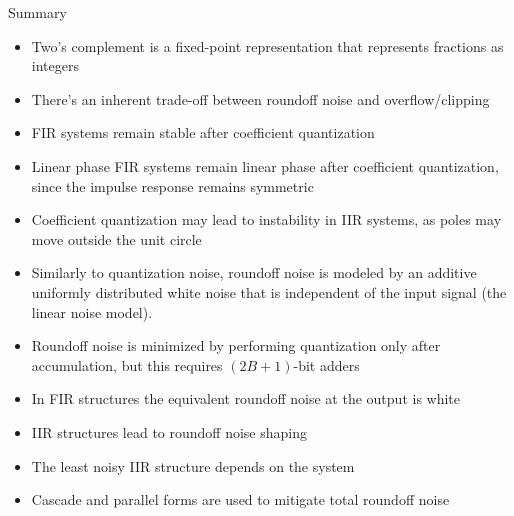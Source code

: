 \documentclass[10pt, aspectratio=169, handout]{beamer}
\begin{document}
%
\begin{frame}{Summary}
\begin{itemize}
	\item Two's complement is a fixed-point representation that represents fractions as integers
	\item There's an inherent trade-off between roundoff noise and overflow/clipping
	\item FIR systems remain stable after coefficient quantization
	\item Linear phase FIR systems remain linear phase after coefficient quantization, since the impulse response remains symmetric
	\item Coefficient quantization may lead to instability in IIR systems, as poles may move outside the unit circle
	\item Similarly to quantization noise, roundoff noise is modeled by an additive uniformly distributed white noise that is independent of the input signal (the linear noise model).
	\item Roundoff noise is minimized by performing quantization only after accumulation, but this requires $(2B+1)$-bit adders
	\item In FIR structures the equivalent roundoff noise at the output is white
	\item IIR structures lead to roundoff noise shaping
	\item The least noisy IIR structure depends on the system
	\item Cascade and parallel forms are used to mitigate total roundoff noise
\end{itemize}
\end{frame}
\end{document}
